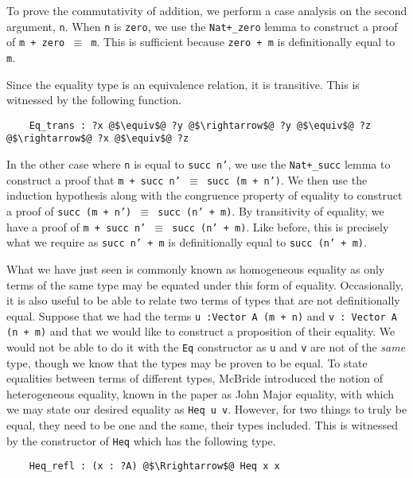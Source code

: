 \documentclass[12pt,twoside,maitrise]{dms}
\theoremstyle{definition}
\numberwithin{equation}{section}
\numberwithin{table}{chapter}
\numberwithin{figure}{chapter}
\newcommand\id[1] {\texttt{#1}}
\newcommand\fn[1] {\texttt{#1}}
\begin{document}
To prove the commutativity of addition, we perform a case analysis on the second
argument, \id{n}. When \id{n} is \id{zero}, we use the \id{Nat+\_zero} lemma to
construct a proof of \fn{m + zero $\equiv$ m}. This is sufficient because
\fn{zero + m} is definitionally equal to \id{m}.

Since the equality type is an equivalence relation, it is transitive. This is
witnessed by the following function.

\begin{verbatim}
    Eq_trans : ?x @$\equiv$@ ?y @$\rightarrow$@ ?y @$\equiv$@ ?z @$\rightarrow$@ ?x @$\equiv$@ ?z
\end{verbatim}

In the other case where \id{n} is equal to \fn{succ n'}, we use the
\id{Nat+\_succ} lemma to construct a proof that \fn{m + succ n' $\equiv$ succ
  (m + n')}. We then use the induction hypothesis along with the congruence
property of equality to construct a proof of \fn{succ (m + n') $\equiv$ succ
  (n' + m)}. By transitivity of equality, we have a proof of \fn{m + succ n'
  $\equiv$ succ (n' + m)}. Like before, this is precisely what we require as
\fn{succ n' + m} is definitionally equal to \fn{succ (n' + m)}.

What we have just seen is commonly known as homogeneous equality as only terms
of the same type may be equated under this form of equality. Occasionally, it is
also useful to be able to relate two terms of types that are not definitionally
equal. Suppose that we had the terms \fn{u :\@ Vector A (m + n)} and \fn{v :\@
  Vector A (n + m)} and that we would like to construct a proposition of their
equality. We would not be able to do it with the \fn{Eq} constructor as \id{u}
and \id{v} are not of the \emph{same} type, though we know that the types may be
proven to be equal. To state equalities between terms of different types,
McBride introduced the notion of heterogeneous
equality\cite{mcbride2000dependently}, known in the paper as John Major
equality, with which we may state our desired equality as \fn{Heq u v}. However,
for two things to truly be equal, they need to be one and the same, their types
included. This is witnessed by the constructor of \fn{Heq} which has the
following type.

\begin{verbatim}
    Heq_refl : (x : ?A) @$\Rrightarrow$@ Heq x x
\end{verbatim}
\end{document}
